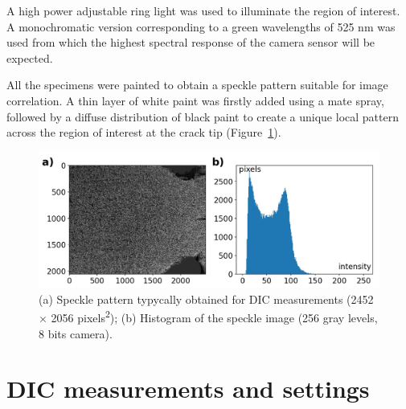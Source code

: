A high power adjustable ring light was used to illuminate the region of interest. A monochromatic version corresponding to a green wavelengths of \num{525} \si{\nano\meter} was used from which the highest spectral response of the camera sensor will be expected.

All the specimens were painted to obtain a speckle pattern suitable for image correlation. A thin layer of white paint was firstly added using a mate spray, followed by a diffuse distribution of black paint to create a unique local pattern across the region of interest at the crack tip (Figure~\ref{fig:Fig17}).

\begin{figure}[t]
	\centering
	\includegraphics[width=.9\textwidth]{Figures/SpecklePattern}
	\decoRule
	\caption{(a) Speckle pattern typycally obtained for DIC measurements (2452 $\times$ 2056
	pixels\textsuperscript{2}); (b) Histogram
	of the
	speckle image
		(256
	gray levels, 8 bits camera).}
	\label{fig:Fig17}
\end{figure}

\section{DIC measurements and settings}

